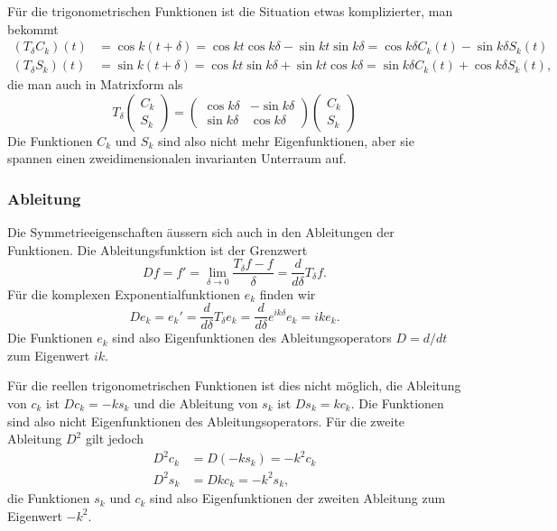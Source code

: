 Für die trigonometrischen Funktionen ist die Situation etwas komplizierter,
man bekommt
\begin{align*}
(T_\delta C_k)(t)
&=
\cos k(t+\delta)
=
\cos kt \cos k\delta - \sin kt \sin k\delta
=
\cos k\delta C_k(t) - \sin k\delta S_k(t)
\\
(T_\delta S_k)(t)
&=
\sin k(t+\delta)
=
\cos kt\sin k\delta
+
\sin kt\cos k\delta
=
\sin k\delta C_k(t)
+
\cos k\delta S_k(t),
\end{align*}
die man auch in Matrixform als
\[
T_\delta
\begin{pmatrix}
C_k\\S_k
\end{pmatrix}
=
\begin{pmatrix}
\cos k\delta & -\sin k\delta \\
\sin k\delta &  \cos k\delta
\end{pmatrix}
\begin{pmatrix}
C_k\\S_k
\end{pmatrix}
\]
Die Funktionen $C_k$ und $S_k$ sind also nicht mehr Eigenfunktionen,
aber sie spannen einen zweidimensionalen invarianten Unterraum auf.

%
%
\subsubsection{Ableitung}
Die Symmetrieeigenschaften äussern sich auch in den Ableitungen
der Funktionen.
Die Ableitungsfunktion ist der Grenzwert
\[
Df
=
f'
=
\lim_{\delta\to 0}
\frac{T_\delta f - f}{\delta}
=
\frac{d}{d\delta} T_\delta f.
\]
Für die komplexen Exponentialfunktionen $e_k$ finden wir
\[
De_k
=
e_k'
=
\frac{d}{d\delta} T_\delta e_k
=
\frac{d}{d\delta} e^{ik\delta} e_k
=
ik e_k.
\]
Die Funktionen $e_k$ sind also Eigenfunktionen des Ableitungsoperators
$D=d/dt$ zum Eigenwert $ik$.

Für die reellen trigonometrischen Funktionen ist dies nicht möglich,
die Ableitung von $c_k$ ist $Dc_k=-ks_k$ und
die Ableitung von $s_k$ ist $Ds_k=kc_k$.
Die Funktionen sind also nicht Eigenfunktionen des Ableitungsoperators.
Für die zweite Ableitung $D^2$ gilt jedoch
\begin{align*}
D^2c_k &= D(-ks_k) = -k^2c_k
\\
D^2s_k &= Dkc_k = -k^2s_k,
\end{align*}
die Funktionen $s_k$ und $c_k$ sind also Eigenfunktionen der zweiten
Ableitung zum Eigenwert $-k^2$.




